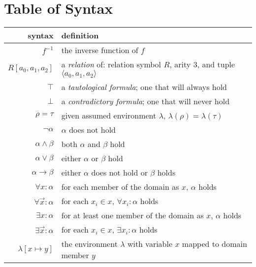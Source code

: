 \section{Table of Syntax}
	\begin{tabular}{|r|l|}
		\hline
		\textbf{syntax}                  &  \textbf{definition}                                                     \\
		\hline
		$f^{-1}$                         &  the inverse function of $f$                                             \\
		\hline
		$R[a_0,a_1,a_2]$                 &  a \emph{relation} of: relation symbol $R$, arity $3$, and tuple $\langle a_0,a_1,a_2 \rangle$  \\
		$\top$                           &  a \emph{tautological formula}; one that will always hold                \\
		$\bot$                           &  a \emph{contradictory formula}; one that will never hold                \\
		$\rho = \tau$                    &  given assumed environment $\lambda$, $\lambda(\rho) = \lambda(\tau)$    \\
		$\neg \alpha$                    &  $\alpha$ does not hold                                                  \\
		$\alpha \wedge \beta$            &  both $\alpha$ and $\beta$ hold                                          \\
		$\alpha \vee \beta$              &  either $\alpha$ or $\beta$ hold                                         \\
		$\alpha \to \beta$               &  either $\alpha$ does not hold or $\beta$ holds                          \\
		$\forall x : \alpha$             &  for each member of the domain as $x$, $\alpha$ holds                    \\
		$\forall \vec{x} : \alpha$       &  for each $x_i \in x$, $\forall x_i : \alpha$ holds                      \\
		$\exists x : \alpha$             &  for at least one member of the domain as $x$, $\alpha$ holds            \\
		$\exists \vec{x} : \alpha$       &  for each $x_i \in x$, $\exists x_i : \alpha$ holds                      \\
		\hline
		$\lambda[x \mapsto y]$           &  the environment $\lambda$ with variable $x$ mapped to domain member $y$ \\

\end{tabular}

